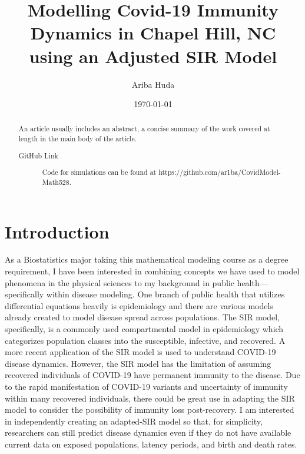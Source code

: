 \documentclass[%
 reprint,
]{revtex4-2}
\begin{document}

\title{Modelling Covid-19 Immunity Dynamics in Chapel Hill, NC \\ using an Adjusted SIR Model}%


\author{Ariba Huda}
%


\date{\today}%

\begin{abstract}
An article usually includes an abstract, a concise summary of the work
covered at length in the main body of the article. 
\begin{description}
\item[GitHub Link]
Code for simulations can be found at https://github.com/ar1ba/CovidModel-Math528.
 
\end{description}
\end{abstract}

\maketitle


\section{\label{sec:level1}Introduction\protect\\}

As a Biostatistics major taking this mathematical modeling course as a degree requirement, I have been interested in combining concepts we have used to model phenomena in the physical sciences to my background in public health—specifically within disease modeling. One branch of public health that utilizes differential equations heavily is epidemiology and there are various models already created to model disease spread across populations. The SIR model, specifically, is a commonly used compartmental model in epidemiology which categorizes population classes into the susceptible, infective, and recovered. A more recent application of the SIR model is used to understand COVID-19 disease dynamics. However, the SIR model has the limitation of assuming recovered individuals of COVID-19 have permanent immunity to the disease. Due to the rapid manifestation of COVID-19 variants and uncertainty of immunity within many recovered individuals, there could be great use in adapting the SIR model to consider the possibility of immunity loss post-recovery. I am interested in independently creating an adapted-SIR model so that, for simplicity, researchers can still predict disease dynamics even if they do not have available current data on exposed populations, latency periods, and birth and death rates.
\end{document}

